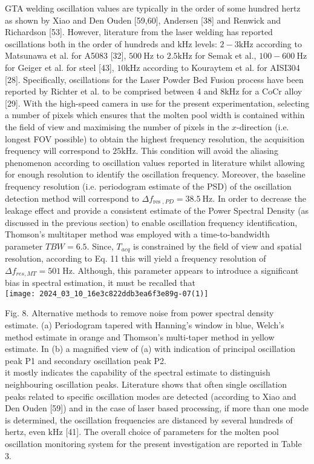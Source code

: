 \documentclass[10pt]{article}
\begin{document}
GTA welding oscillation values are typically in the order of some hundred hertz as shown by Xiao and Den Ouden [59,60], Andersen [38] and Renwick and Richardson [53]. However, literature from the laser welding has reported oscillations both in the order of hundreds and $\mathrm{kHz}$ levels: $2-3 \mathrm{kHz}$ according to Matsunawa et al. for A5083 [32], $500 \mathrm{~Hz}$ to $2.5 \mathrm{kHz}$ for Semak et al., $100-600 \mathrm{~Hz}$ for Geiger et al. for steel [43], $10 \mathrm{kHz}$ according to Kouraytem et al. for AISI304 [28]. Specifically, oscillations for the Laser Powder Bed Fusion process have been reported by Richter et al. to be comprised between 4 and $8 \mathrm{kHz}$ for a CoCr alloy [29]. With the high-speed camera in use for the present experimentation, selecting a number of pixels which ensures that the molten pool width is contained within the field of view and maximising the number of pixels in the $x$-direction (i.e. longest FOV possible) to obtain the highest frequency resolution, the acquisition frequency will correspond to $25 \mathrm{kHz}$. This condition will avoid the aliasing phenomenon according to oscillation values reported in literature whilst allowing for enough resolution to identify the oscillation frequency. Moreover, the baseline frequency resolution (i.e. periodogram estimate of the PSD) of the oscillation detection method will correspond to $\Delta f_{\text {res }, P D}=38.5 \mathrm{~Hz}$. In order to decrease the leakage effect and provide a consistent estimate of the Power Spectral Density (as discussed in the previous section) to enable oscillation frequency identification, Thomson's multitaper method was employed with a time-to-bandwidth parameter $T B W=6.5$. Since, $T_{a c q}$ is constrained by the field of view and spatial resolution, according to Eq. 11 this will yield a frequency resolution of $\Delta f_{r e s, M T}=501 \mathrm{~Hz}$. Although, this parameter appears to introduce a significant bias in spectral estimation, it must be recalled that\\
\texttt{[image: 2024\_03\_10\_16e3c822ddb3ea6f3e89g-07(1)]}

Fig. 8. Alternative methods to remove noise from power spectral density estimate. (a) Periodogram tapered with Hanning's window in blue, Welch's method estimate in orange and Thomson's multi-taper method in yellow estimate. In (b) a magnified view of (a) with indication of principal oscillation peak P1 and secondary oscillation peak P2.\\
it mostly indicates the capability of the spectral estimate to distinguish neighbouring oscillation peaks. Literature shows that often single oscillation peaks related to specific oscillation modes are detected (according to Xiao and Den Ouden [59]) and in the case of laser based processing, if more than one mode is determined, the oscillation frequencies are distanced by several hundreds of hertz, even $\mathrm{kHz}$ [41]. The overall choice of parameters for the molten pool oscillation monitoring system for the present investigation are reported in Table 3.
\end{document}
